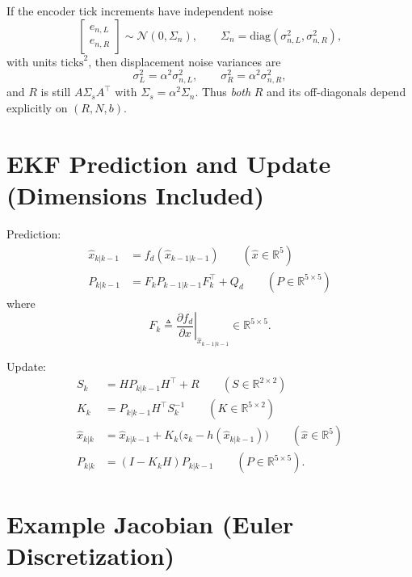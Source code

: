 \documentclass[11pt]{article}
\begin{document}
If the encoder tick increments have independent noise
\begin{equation}
\begin{bmatrix}e_{n,L}\\e_{n,R}\end{bmatrix}\sim\mathcal{N}(0,\Sigma_n),\qquad \Sigma_n=\mathrm{diag}(\sigma_{n,L}^2,\sigma_{n,R}^2),
\end{equation}
with units $\text{ticks}^2$, then displacement noise variances are
\begin{equation}
\sigma_L^2 = \alpha^2\sigma_{n,L}^2,\qquad \sigma_R^2 = \alpha^2\sigma_{n,R}^2,
\end{equation}
and $R$ is still $A\Sigma_sA^\top$ with $\Sigma_s=\alpha^2\Sigma_n$.
Thus \emph{both} $R$ and its off-diagonals depend explicitly on $(R,N,b)$.

\section*{EKF Prediction and Update (Dimensions Included)}

Prediction:
\begin{align}
\hat{x}_{k|k-1} &= f_d(\hat{x}_{k-1|k-1}) \qquad (\hat{x}\in\mathbb{R}^5)\\
P_{k|k-1} &= F_k P_{k-1|k-1} F_k^\top + Q_d \qquad (P\in\mathbb{R}^{5\times5})
\end{align}
where
\begin{equation}
F_k \triangleq \left.\frac{\partial f_d}{\partial x}\right|_{\hat{x}_{k-1|k-1}} \in \mathbb{R}^{5\times 5}.
\end{equation}

Update:
\begin{align}
S_k &= H P_{k|k-1} H^\top + R \qquad (S\in\mathbb{R}^{2\times2})\\
K_k &= P_{k|k-1} H^\top S_k^{-1} \qquad (K\in\mathbb{R}^{5\times2})\\
\hat{x}_{k|k} &= \hat{x}_{k|k-1} + K_k\Big(z_k - h(\hat{x}_{k|k-1})\Big) \qquad (\hat{x}\in\mathbb{R}^5)\\
P_{k|k} &= (I - K_k H) P_{k|k-1} \qquad (P\in\mathbb{R}^{5\times5}).
\end{align}

\section*{Example Jacobian (Euler Discretization)}
\end{document}
